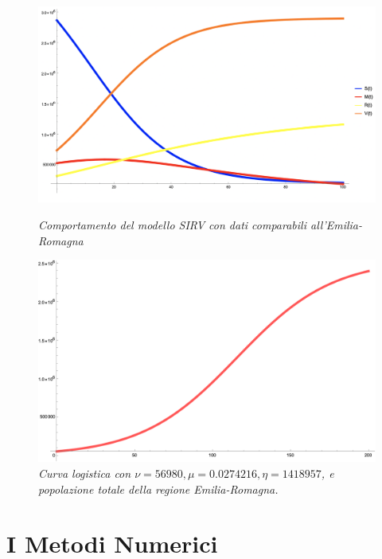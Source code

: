 \documentclass{article}
\begin{document}
\begin{figure}[h!]
\centering
\begin{minipage}[t]{.4\paperwidth}
    \hspace{-10pt}
    \includegraphics[width=\textwidth]{SMRV.png}
    \caption{\textit{Comportamento del modello SIRV con dati 
    comparabili all'Emilia-Romagna}}
    \label{fig::SIRV}
    \end{minipage}%
\hfill %
\begin{minipage}[t]{.4\paperwidth}
    \hspace{-10pt}
    \includegraphics[width=\textwidth]{vaccinati.png}
    \caption{\textit{Curva logistica con $\nu=56980, 
    \mu=0.0274216, \eta=1418957$, e popolazione totale della regione 
    Emilia-Romagna.}}
    \label{fig::vaccinati}
\end{minipage}
\end{figure}

\section{I Metodi Numerici}
\end{document}
